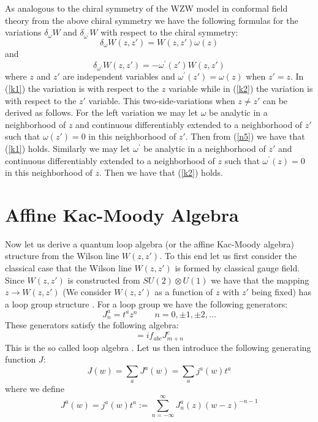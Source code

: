 \documentclass[a4paper,a4paper]{article}
\begin{document}
As analogous to the chiral symmetry of the WZW model in
conformal field theory \cite{Fra}
from the above chiral symmetry  we have the following formulas for the
variations $\delta_{\omega}W$ and $\delta_{\omega^{\prime}}W$ with
respect to the chiral symmetry:
\begin{equation}
\delta_{\omega}W(z,z')=W(z,z')\omega(z)
\label{k1}
\end{equation}
and
\begin{equation}
\delta_{\omega^{\prime}}W(z,z')=-\omega^{\prime}(z')W(z,z')
\label{k2}
\end{equation}
where $z$ and $z'$ are independent variables and
$\omega^{\prime}(z')=\omega(z)$ when
$z'=z$. In (\ref{k1}) the variation is with respect to the
$z$ variable while in (\ref{k2}) the variation is with
respect to the $z'$ variable. This two-side-variations 
when $z\neq z'$ can be derived as follows.
For the left variation we may let $\omega$ be analytic
in a neighborhood of $z$ and continuous differentiably extended to a neighborhood of $z'$
such that $\omega(z')=0$ in this neighborhood of $z'$. Then from (\ref{n5}) we have that
(\ref{k1}) holds. Similarly we may let
$\omega^{\prime}$ be analytic in a neighborhood of $z'$
and continuous differentiably extended to a neighborhood of $z$ such that $\omega^{\prime}(z)=0$ in this neighborhood of $z$. Then we have that
(\ref{k2}) holds.


\section{Affine Kac-Moody Algebra} \label{sec6}

Now let us derive a quantum loop
algebra (or the affine Kac-Moody algebra)
structure from the Wilson line $W(z,z')$. To this end
let us first consider the classical case that the Wilson line $W(z,z')$ is formed by classical gauge field. 
Since $W(z,z')$ is constructed from $ SU(2)\otimes U(1)$ we have that the mapping $z \to W(z,z')$ (We consider $W(z,z')$ as a function of $z$ with $z'$ being fixed) has a loop group structure \cite{Lus}\cite{Seg}.
For a loop group we have the following generators:
\begin{equation}
J_n^a = t^a z^n \qquad n=0, \pm 1, \pm 2, ...
\label{km1}
\end{equation}
These generators satisfy the following algebra:
\begin{equation}
[J_m^a, J_n^b] =
if_{abc}J_{m+n}^c 
\label{km2}
\end{equation}
This is  the so called loop algebra \cite{Lus}\cite{Seg}. 
Let us then introduce the following generating
function $J$:
\begin{equation}
J(w) = \sum_a J^a(w)=\sum_a j^a(w) t^a
\label{km3}
\end{equation}
where we define
\begin{equation}
J^a(w)= j^a(w) t^a :=
\sum_{n=-\infty}^{\infty}J_n^a(z) (w-z)^{-n-1}  
\label{km3a}
\end{equation}
\end{document}
